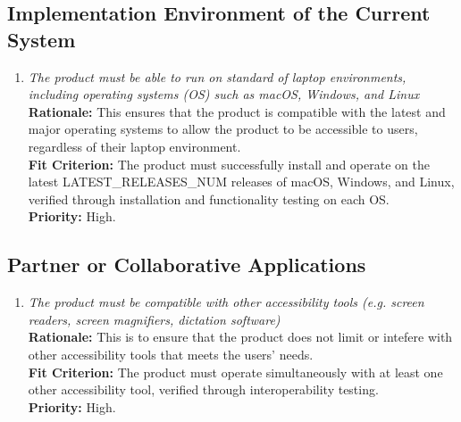 \documentclass[12pt]{article}
\begin{document}
\subsection{Implementation Environment of the Current System}
\begin{enumerate}[label=MD-IE \arabic*., wide=0pt, leftmargin=*]
  \item \emph{The product must be able to run on standard of laptop
      environments, including operating systems (OS) such as
    macOS, Windows, and Linux}\\[2mm]
    {\bf Rationale:} This ensures that the product is compatible with
    the latest and major operating systems to allow the product to be
    accessible to users, regardless of their laptop environment.\\
    {\bf Fit Criterion:} The product must successfully install and
    operate on the latest LATEST\_RELEASES\_NUM releases of macOS, Windows, and Linux,
    verified through installation and functionality testing on each OS.\\
    {\bf Priority:} High.
\end{enumerate}
\subsection{Partner or Collaborative Applications}
\begin{enumerate}[label=MD-PA \arabic*., wide=0pt, leftmargin=*]
  \item \emph{The product must be compatible with other accessibility
    tools (e.g. screen readers, screen magnifiers, dictation software)}\\[2mm]
    {\bf Rationale:} This is to ensure that the product does not
    limit or intefere with other accessibility tools that
    meets the users' needs. \\
    {\bf Fit Criterion:} The product must operate simultaneously with
    at least one other accessibility tool,
    verified through interoperability testing. \\
    {\bf Priority:} High.
\end{enumerate}
\end{document}
